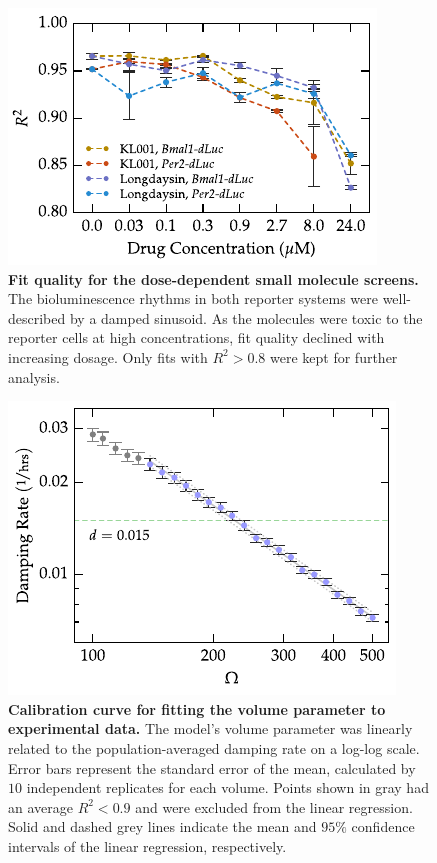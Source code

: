 \documentclass[11pt, letterpaper]{article}
\newcommand{\beginsupplement}{%
        \clearpage
        \setcounter{table}{0}
        \renewcommand{\thetable}{S\arabic{table}}%
        \setcounter{figure}{0}
        \renewcommand{\thefigure}{S\arabic{figure}}%
     }
\begin{document}



\beginsupplement

\begin{figure}[tbp]
  \begin{center}
    \includegraphics[]{figures/pdfs/small_molecule_r2.pdf}
  \end{center}
  \caption{{\bfseries Fit quality for the dose-dependent small molecule screens.} The bioluminescence rhythms in both reporter systems were well-described by a damped sinusoid. As the molecules were toxic to the reporter cells at high concentrations, fit quality declined with increasing dosage. Only fits with $R^2 > 0.8$ were kept for further analysis.}
\label{fig:small_molecule_r2}
\end{figure}

\begin{figure}[tbp]
  \begin{center}
    \includegraphics[]{figures/pdfs/volume_calibration.pdf}
  \end{center}
  \caption{{\bfseries Calibration curve for fitting the volume parameter to experimental data.} The model's volume parameter was linearly related to the population-averaged damping rate on a log-log scale. Error bars represent the standard error of the mean, calculated by $10$ independent replicates for each volume. Points shown in gray had an average $R^2 < 0.9$ and were excluded from the linear regression. Solid and dashed grey lines indicate the mean and $95\%$ confidence intervals of the linear regression, respectively.}
\label{fig:vol_calibration}
\end{figure}
\end{document}
